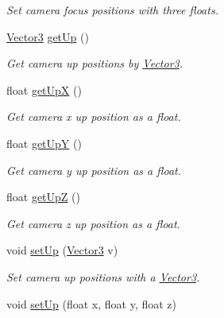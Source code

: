 \begin{DoxyCompactItemize}
\begin{DoxyCompactList}\small\item\em Set camera focus positions with three floats. \end{DoxyCompactList}\item 
\hypertarget{class_camera_a907f2f1f337e4c62f52174167f6ea148}{\hyperlink{struct_vector3}{Vector3} \hyperlink{class_camera_a907f2f1f337e4c62f52174167f6ea148}{get\-Up} ()}\label{class_camera_a907f2f1f337e4c62f52174167f6ea148}

\begin{DoxyCompactList}\small\item\em Get camera up positions by \hyperlink{struct_vector3}{Vector3}. \end{DoxyCompactList}\item 
\hypertarget{class_camera_ae57276d6440259bbc960515c7894d431}{float \hyperlink{class_camera_ae57276d6440259bbc960515c7894d431}{get\-Up\-X} ()}\label{class_camera_ae57276d6440259bbc960515c7894d431}

\begin{DoxyCompactList}\small\item\em Get camera x up position as a float. \end{DoxyCompactList}\item 
\hypertarget{class_camera_a0366609e928163de2455a3d2f6d8673f}{float \hyperlink{class_camera_a0366609e928163de2455a3d2f6d8673f}{get\-Up\-Y} ()}\label{class_camera_a0366609e928163de2455a3d2f6d8673f}

\begin{DoxyCompactList}\small\item\em Get camera y up position as a float. \end{DoxyCompactList}\item 
\hypertarget{class_camera_abc66e19d6e2854f769cfad869e5d0828}{float \hyperlink{class_camera_abc66e19d6e2854f769cfad869e5d0828}{get\-Up\-Z} ()}\label{class_camera_abc66e19d6e2854f769cfad869e5d0828}

\begin{DoxyCompactList}\small\item\em Get camera z up position as a float. \end{DoxyCompactList}\item 
\hypertarget{class_camera_a05b6cdbe20ed483ba250e5cf014edcde}{void \hyperlink{class_camera_a05b6cdbe20ed483ba250e5cf014edcde}{set\-Up} (\hyperlink{struct_vector3}{Vector3} v)}\label{class_camera_a05b6cdbe20ed483ba250e5cf014edcde}

\begin{DoxyCompactList}\small\item\em Set camera up positions with a \hyperlink{struct_vector3}{Vector3}. \end{DoxyCompactList}\item 
\hypertarget{class_camera_a2c6de15f799c8e23c26d3a3f3ee1dcf8}{void \hyperlink{class_camera_a2c6de15f799c8e23c26d3a3f3ee1dcf8}{set\-Up} (float x, float y, float z)}\label{class_camera_a2c6de15f799c8e23c26d3a3f3ee1dcf8}


\end{DoxyCompactItemize}
